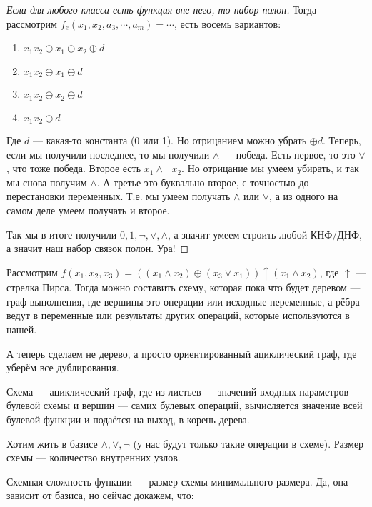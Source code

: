 \begin{proof}[Если для любого класса есть функция вне него, то набор полон]
	Тогда рассмотрим $f_e(x_1, x_2, a_3, \cdots, a_m) = \cdots$, есть восемь вариантов: 

	\begin{enumerate}
		\item{$x_1 x_2 \oplus x_1 \oplus x_2 \oplus d$}
		\item{$x_1 x_2 \oplus x_1 \oplus d$}
		\item{$x_1 x_2 \oplus x_2 \oplus d$}
		\item{$x_1 x_2 \oplus d$}
	\end{enumerate}

	Где $d$ --- какая-то константа (0 или 1). Но отрицанием можно убрать $\oplus d$. Теперь, если мы получили последнее, то мы получили $\land$ --- победа. Есть первое, то это $\lor$, что тоже победа. Второе есть $x_1 \land \lnot x_2$. Но отрицание мы умеем убирать, и так мы снова получим $\land$. А третье это буквально второе, с точностью до перестановки переменных. Т.е. мы умеем получать $\land$ или $\lor$, а из одного на самом деле умеем получать и второе.

	Так мы в итоге получили $0, 1, \lnot, \lor, \land$, а значит умеем строить любой КНФ/ДНФ, а значит наш набор связок полон. Ура!
\end{proof}

Рассмотрим $f(x_1, x_2, x_3) = ((x_1 \land x_2) \oplus (x_3 \lor x_1)) \uparrow (x_1 \land x_2)$, где $\uparrow$  --- стрелка Пирса. Тогда можно составить схему, которая пока что будет деревом  --- граф выполнения, где вершины это операции или исходные переменные, а рёбра ведут в переменные или результаты других операций, которые используются в нашей. 

А теперь сделаем не дерево, а просто ориентированный ациклический граф, где уберём все дублирования. 

\begin{definition}
	Схема --- ациклический граф, где из листьев --- значений входных параметров булевой схемы и вершин --- самих булевых операций, вычисляется значение всей булевой функции и подаётся на выход, в корень дерева. 
\end{definition}

Хотим жить в базисе $\land, \lor, \lnot$ (у нас будут только такие операции в схеме). Размер схемы --- количество внутренних узлов. 

\begin{definition}
	Схемная сложность функции --- размер схемы минимального размера. Да, она зависит от базиса, но сейчас докажем, что:
\end{definition}


